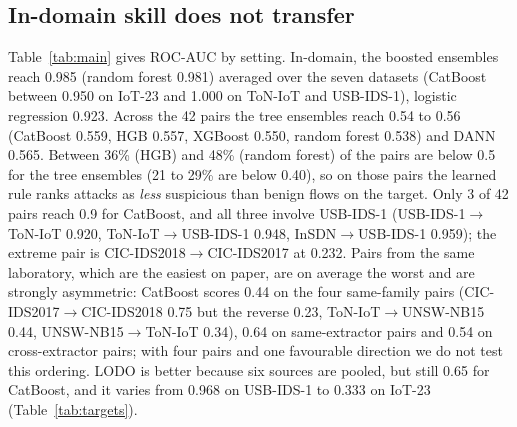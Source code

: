 \documentclass[pdflatex,sn-mathphys-num]{sn-jnl}%
\begin{document}
\subsection{In-domain skill does not transfer}
Table~\ref{tab:main} gives ROC-AUC by setting.
In-domain, the boosted ensembles reach 0.985 (random forest 0.981) averaged over the seven datasets (CatBoost between 0.950 on IoT-23 and 1.000 on ToN-IoT and USB-IDS-1), logistic regression 0.923.
Across the 42 pairs the tree ensembles reach 0.54 to 0.56 (CatBoost 0.559, HGB 0.557, XGBoost 0.550, random forest 0.538) and DANN 0.565.
Between 36\% (HGB) and 48\% (random forest) of the pairs are below 0.5 for the tree ensembles (21 to 29\% are below 0.40), so on those pairs the learned rule ranks attacks as \emph{less} suspicious than benign flows on the target.
Only 3 of 42 pairs reach 0.9 for CatBoost, and all three involve USB-IDS-1 (USB-IDS-1$\rightarrow$ToN-IoT 0.920, ToN-IoT$\rightarrow$USB-IDS-1 0.948, InSDN$\rightarrow$USB-IDS-1 0.959); the extreme pair is CIC-IDS2018$\rightarrow$CIC-IDS2017 at 0.232.
Pairs from the same laboratory, which are the easiest on paper, are on average the worst and are strongly asymmetric: CatBoost scores 0.44 on the four same-family pairs (CIC-IDS2017$\rightarrow$CIC-IDS2018 0.75 but the reverse 0.23, ToN-IoT$\rightarrow$UNSW-NB15 0.44, UNSW-NB15$\rightarrow$ToN-IoT 0.34), 0.64 on same-extractor pairs and 0.54 on cross-extractor pairs; with four pairs and one favourable direction we do not test this ordering.
LODO is better because six sources are pooled, but still 0.65 for CatBoost, and it varies from 0.968 on USB-IDS-1 to 0.333 on IoT-23 (Table~\ref{tab:targets}).
\end{document}
